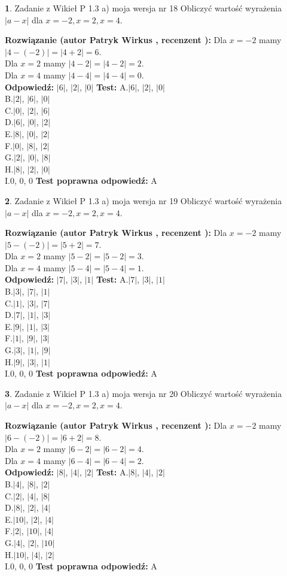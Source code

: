 \documentclass[12pt, a4paper]{article}
\theoremstyle{definition} %
\newtheorem{zad}{}
\newcommand{\zadStart}[1]{\begin{zad}#1\newline}
\newcommand{\zadStop}{\end{zad}}
\newcommand{\rozwStart}[2]{\noindent \textbf{Rozwiązanie (autor #1 , recenzent #2): }\newline}
\newcommand{\rozwStop}{\newline}
\newcommand{\odpStart}{\noindent \textbf{Odpowiedź:}\newline}
\newcommand{\odpStop}{\newline}
\newcommand{\testStart}{\noindent \textbf{Test:}\newline}
\newcommand{\testStop}{\newline}
\newcommand{\kluczStart}{\noindent \textbf{Test poprawna odpowiedź:}\newline}
\newcommand{\kluczStop}{\newline}
\begin{document}
\zadStart{Zadanie z Wikieł P 1.3 a) moja wersja nr 18}
Obliczyć wartość wyrażenia $|a - x|$ dla $x=-2,x=2,x=4$.
\zadStop
\rozwStart{Patryk Wirkus}{}
Dla $x = -2$ mamy $|4 - (-2)| = |4 + 2| = 6$.\\
Dla $x = 2$ mamy $|4 - 2| = |4 - 2| = 2$.\\
Dla $x = 4$ mamy $|4 - 4| = |4 - 4| = 0$.\\
\rozwStop
\odpStart
$|6|$, $|2|$, $|0|$
\odpStop
\testStart
A.$|6|$, $|2|$, $|0|$\\
B.$|2|$, $|6|$, $|0|$\\
C.$|0|$, $|2|$, $|6|$\\
D.$|6|$, $|0|$, $|2|$\\
E.$|8|$, $|0|$, $|2|$\\
F.$|0|$, $|8|$, $|2|$\\
G.$|2|$, $|0|$, $|8|$\\
H.$|8|$, $|2|$, $|0|$\\
I.$0$, $0$, $0$
\testStop
\kluczStart
A
\kluczStop



\zadStart{Zadanie z Wikieł P 1.3 a) moja wersja nr 19}
Obliczyć wartość wyrażenia $|a - x|$ dla $x=-2,x=2,x=4$.
\zadStop
\rozwStart{Patryk Wirkus}{}
Dla $x = -2$ mamy $|5 - (-2)| = |5 + 2| = 7$.\\
Dla $x = 2$ mamy $|5 - 2| = |5 - 2| = 3$.\\
Dla $x = 4$ mamy $|5 - 4| = |5 - 4| = 1$.\\
\rozwStop
\odpStart
$|7|$, $|3|$, $|1|$
\odpStop
\testStart
A.$|7|$, $|3|$, $|1|$\\
B.$|3|$, $|7|$, $|1|$\\
C.$|1|$, $|3|$, $|7|$\\
D.$|7|$, $|1|$, $|3|$\\
E.$|9|$, $|1|$, $|3|$\\
F.$|1|$, $|9|$, $|3|$\\
G.$|3|$, $|1|$, $|9|$\\
H.$|9|$, $|3|$, $|1|$\\
I.$0$, $0$, $0$
\testStop
\kluczStart
A
\kluczStop



\zadStart{Zadanie z Wikieł P 1.3 a) moja wersja nr 20}
Obliczyć wartość wyrażenia $|a - x|$ dla $x=-2,x=2,x=4$.
\zadStop
\rozwStart{Patryk Wirkus}{}
Dla $x = -2$ mamy $|6 - (-2)| = |6 + 2| = 8$.\\
Dla $x = 2$ mamy $|6 - 2| = |6 - 2| = 4$.\\
Dla $x = 4$ mamy $|6 - 4| = |6 - 4| = 2$.\\
\rozwStop
\odpStart
$|8|$, $|4|$, $|2|$
\odpStop
\testStart
A.$|8|$, $|4|$, $|2|$\\
B.$|4|$, $|8|$, $|2|$\\
C.$|2|$, $|4|$, $|8|$\\
D.$|8|$, $|2|$, $|4|$\\
E.$|10|$, $|2|$, $|4|$\\
F.$|2|$, $|10|$, $|4|$\\
G.$|4|$, $|2|$, $|10|$\\
H.$|10|$, $|4|$, $|2|$\\
I.$0$, $0$, $0$
\testStop
\kluczStart
A
\kluczStop
\end{document}
